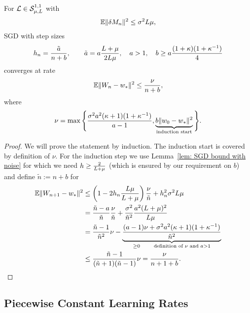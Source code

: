 \begin{theorem}
	For \(\mathcal{L}\in\mathcal{S}^{1,1}_{{\mu},{L}}\) with
	\begin{align*}
		\mathbb{E}\|\delta M_n\|^2 \le \sigma^2 L\mu,
	\end{align*}
	SGD with step sizes
	\begin{align*}
		h_n = \frac{\tilde{a}}{n+b},
		\qquad \tilde{a} =  a\frac{L+\mu}{2L\mu},
		\quad a > 1,
		\quad b \ge a\frac{(1+\kappa)(1+\kappa^{-1})}{4}
	\end{align*}
	converges at rate
	\begin{align*}
		\mathbb{E}\|W_n - w_*\|^2
		\le \frac{\nu}{n+b},
	\end{align*}
	where
	\begin{align*}
		\nu = \max\Bigg\{
			\frac{\sigma^2a^2(\kappa+1)(1+\kappa^{-1})}{a-1},
			\underbrace{
				b\|w_0 - w_*\|^2
			}_{\text{induction start}}
		\Bigg\}.
	\end{align*}
\end{theorem}
\begin{proof}
	We will prove the statement by induction. The induction start is covered by
	definition of \(\nu\). For the induction step we use Lemma~\ref{lem: SGD
	bound with noise} for which we need \(h \ge \tfrac{2}{L+\mu}\)
	(which is ensured by our requirement on \(b\)) and define \(\tilde{n}:=n+b\)
	for
	\begin{align*}
		\mathbb{E}\|W_{n+1}-w_*\|^2
		&\le \left(1-2h_n \frac{L\mu}{L+\mu}\right)\frac{\nu}{\tilde{n}}
		+ h_n^2 \sigma^2 L\mu\\
		&= \frac{\tilde{n} - a}{\tilde{n}}\frac{\nu}{\tilde{n}}
		+ \frac{\sigma^2}{\tilde{n}^2}\frac{a^2(L+\mu)^2}{L\mu}\\
		&= \frac{\tilde{n} - 1}{\tilde{n}^2}\nu
		- \underbrace{\frac{(a -1)\nu + \sigma^2 a^2(\kappa+1)(1+\kappa^{-1})}{\tilde{n}^2}}_{
			\ge 0\qquad \text{definition of \(\nu\) and } a>1
		}\\
		&\le \frac{\tilde{n}-1}{(\tilde{n}+1)(\tilde{n}-1)}\nu = \frac{\nu}{n+1+b}.
		\qedhere
	\end{align*}
\end{proof}

\subsection{Piecewise Constant Learning Rates}

